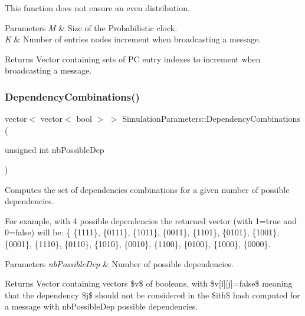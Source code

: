 This function does not ensure an even distribution. 
\begin{DoxyParams}{Parameters}
{\em M} & Size of the Probabilistic clock. \\
\hline
{\em K} & Number of entries nodes increment when broadcasting a message. \\
\hline
\end{DoxyParams}
\begin{DoxyReturn}{Returns}
Vector containing sets of PC entry indexes to increment when broadcasting a message. 
\end{DoxyReturn}
\mbox{\label{class_simulation_parameters_a9694dd5f7c2028efe03dc273d8fdcbd7}} 
\subsubsection{\texorpdfstring{Dependency\+Combinations()}{DependencyCombinations()}}
{\footnotesize\ttfamily vector$<$ vector$<$ bool $>$ $>$ Simulation\+Parameters\+::\+Dependency\+Combinations (\begin{DoxyParamCaption}\item[{unsigned int}]{nb\+Possible\+Dep }\end{DoxyParamCaption})\hspace{0.3cm}{\ttfamily [protected]}}



Computes the set of dependencies combinations for a given number of possible dependencies. 

For example, with 4 possible dependencies the returned vector (with 1=true and 0=false) will be\+: \{ \{1111\}, \{0111\}, \{1011\}, \{0011\}, \{1101\}, \{0101\}, \{1001\}, \{0001\}, \{1110\}, \{0110\}, \{1010\}, \{0010\}, \{1100\}, \{0100\}, \{1000\}, \{0000\}. 
\begin{DoxyParams}{Parameters}
{\em nb\+Possible\+Dep} & Number of possible dependencies. \\
\hline
\end{DoxyParams}
\begin{DoxyReturn}{Returns}
Vector containing vectors \$v\$ of booleans, with \$v\mbox{[}i\mbox{]}\mbox{[}j\mbox{]}=false\$ meaning that the dependency \$j\$ should not be considered in the \$ith\$ hash computed for a message with nb\+Possible\+Dep possible dependencies. 
\end{DoxyReturn}
\mbox{\label{class_simulation_parameters_a4e6bb792e1487214e5cf1d64c8841064}} 
